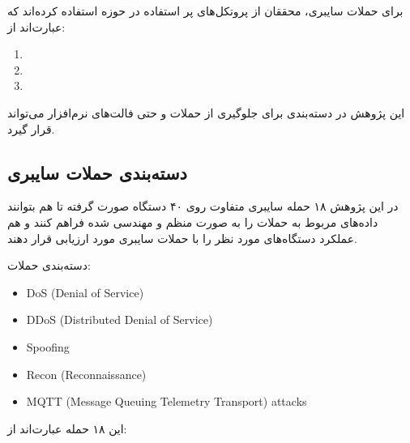 برای حملات سایبری، محققان از پروتکل‌های پر استفاده در حوزه  استفاده
کرده‌اند که عبارت‌اند از:

\begin{enumerate}
    \item {}
    \item {}
    \item {}
\end{enumerate}

این پژوهش در دسته‌بندی  برای جلوگیری از حملات و حتی
فالت‌های نرم‌افزار می‌تواند قرار گیرد.

\subsection{دسته‌بندی حملات سایبری}

در این پژوهش ۱۸ حمله سایبری متفاوت روی ۴۰ دستگاه  صورت گرفته تا هم
بتوانند داده‌های مربوط به حملات را به صورت منظم و مهندسی شده فراهم کنند و هم
عملکرد دستگاه‌های  مورد نظر را با حملات سایبری مورد ارزیابی قرار دهند.

دسته‌بندی حملات:

\begin{LTR}
    \begin{itemize}
        \item DoS (Denial of Service)
        \item DDoS (Distributed Denial of Service)
        \item Spoofing
        \item Recon (Reconnaissance)
        \item MQTT (Message Queuing Telemetry Transport) attacks
    \end{itemize}
\end{LTR}

این ۱۸ حمله عبارت‌اند از:

